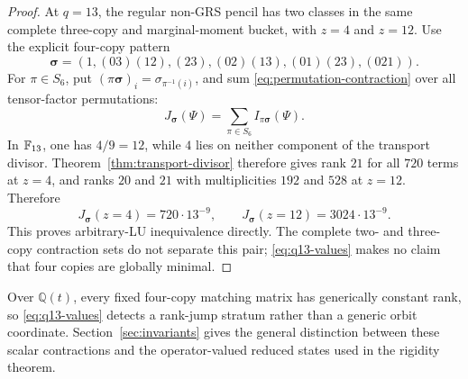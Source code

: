 \begin{proof}
At \(q=13\), the regular non-GRS pencil has two classes in the same complete
three-copy and marginal-moment bucket, with \(z=4\) and \(z=12\).
Use the explicit four-copy pattern
\[
\boldsymbol\sigma=(1,(03)(12),(23),(02)(13),(01)(23),(021)).
\]
For \(\pi\in S_6\), put
\((\pi\boldsymbol\sigma)_i=\sigma_{\pi^{-1}(i)}\), and sum
\eqref{eq:permutation-contraction}
over all tensor-factor permutations:
\[
 J_{\boldsymbol\sigma}(\Psi)
   =\sum_{\pi\in S_6}I_{\pi\boldsymbol\sigma}(\Psi).
\]
In \(\mathbb F_{13}\), one has \(4/9=12\), while \(4\) lies on neither component
of the transport divisor.  Theorem~\ref{thm:transport-divisor} therefore
gives rank \(21\) for all \(720\) terms at \(z=4\), and ranks \(20\) and
\(21\) with multiplicities \(192\) and \(528\) at \(z=12\).
Therefore
\begin{equation}\label{eq:q13-values}
 J_{\boldsymbol\sigma}(z=4)=720\cdot13^{-9},\qquad
 J_{\boldsymbol\sigma}(z=12)=3024\cdot13^{-9}.
\end{equation}
This proves arbitrary-LU inequivalence directly.  The complete two- and
three-copy contraction sets do not separate this pair;
\eqref{eq:q13-values} makes no
claim that four copies are globally minimal.
\end{proof}

Over \(\mathbb Q(t)\), every fixed four-copy matching matrix has generically
constant rank, so \eqref{eq:q13-values} detects a rank-jump stratum rather
than a generic orbit coordinate.  Section~\ref{sec:invariants} gives the
general distinction between these scalar contractions and the
operator-valued reduced states used in the rigidity theorem.
